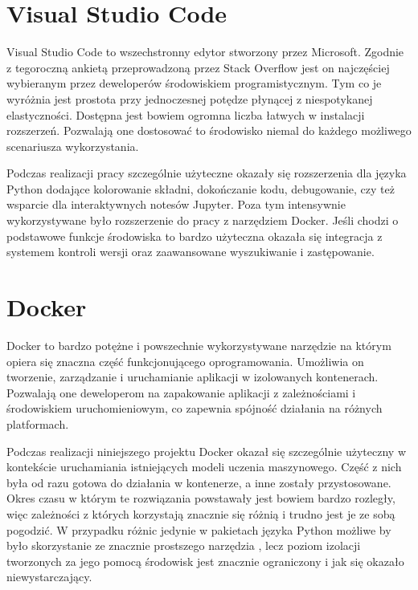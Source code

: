 \section{Visual Studio Code}
Visual Studio Code to wszechstronny edytor stworzony przez Microsoft. Zgodnie z tegoroczną ankietą  \cite{stackoverflow-survey} przeprowadzoną przez Stack Overflow jest on najczęściej wybieranym przez deweloperów środowiskiem programistycznym. Tym co je wyróżnia jest prostota przy jednoczesnej potędze płynącej z niespotykanej elastyczności. Dostępna jest bowiem ogromna liczba łatwych w instalacji rozszerzeń. Pozwalają one dostosować to środowisko niemal do każdego możliwego scenariusza wykorzystania.

Podczas realizacji pracy szczególnie użyteczne okazały się rozszerzenia dla języka Python dodające kolorowanie składni, dokończanie kodu, debugowanie, czy też wsparcie dla interaktywnych notesów Jupyter. Poza tym intensywnie wykorzystywane było rozszerzenie do pracy z narzędziem Docker. Jeśli chodzi o podstawowe funkcje środowiska to bardzo użyteczna okazała się integracja z systemem kontroli wersji oraz zaawansowane wyszukiwanie i zastępowanie.

\section{Docker}
Docker to bardzo potężne i powszechnie wykorzystywane narzędzie na którym opiera się znaczna część funkcjonującego oprogramowania. Umożliwia on tworzenie, zarządzanie i uruchamianie aplikacji w izolowanych kontenerach. Pozwalają one deweloperom na zapakowanie aplikacji z zależnościami i środowiskiem uruchomieniowym, co zapewnia spójność działania na różnych platformach.

Podczas realizacji niniejszego projektu Docker okazał się szczególnie użyteczny w kontekście uruchamiania istniejących modeli uczenia maszynowego. Część z nich była od razu gotowa do działania w kontenerze, a inne zostały przystosowane. Okres czasu w którym te rozwiązania powstawały jest bowiem bardzo rozległy, więc zależności z których korzystają znacznie się różnią i trudno jest je ze sobą pogodzić. W przypadku różnic jedynie w pakietach języka Python możliwe by było skorzystanie ze znacznie prostszego narzędzia , lecz poziom izolacji tworzonych za jego pomocą środowisk jest znacznie ograniczony i jak się okazało niewystarczający.


